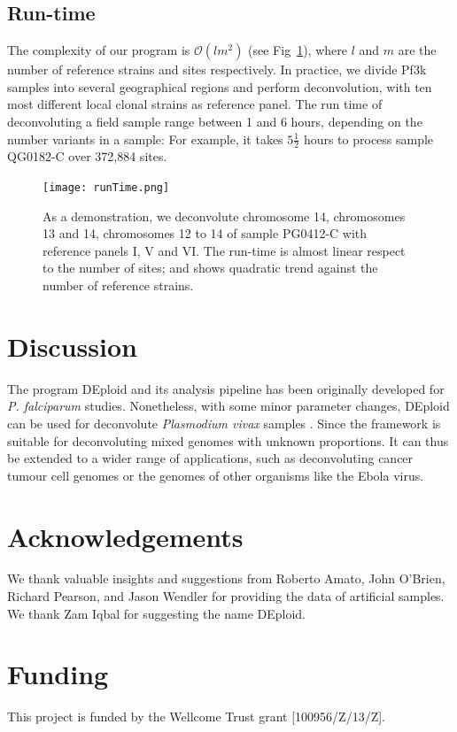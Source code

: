 \documentclass{bioinfo}
\begin{document}
\subsection{Run-time}
The complexity of our program is $\mathcal{O}(lm^2)$ (see Fig~\ref{fig:runtime}), where $l$ and $m$ are the number of reference strains and sites respectively. In practice, we divide Pf3k samples into several geographical regions and perform deconvolution, with ten most different local clonal strains as reference panel. The run time of deconvoluting a field sample range between 1 and 6 hours, depending on the number variants in a sample: For example, it takes $5\frac{1}{2}$ hours to process sample {\textmd QG0182-C} over 372,884 sites.


\begin{figure}[htb]
\centering
\texttt{[image: runTime.png]}
\caption{As a demonstration, we deconvolute chromosome 14, chromosomes 13 and 14, chromosomes 12 to 14 of sample {\textmd PG0412-C} with reference panels I, V and VI. The run-time is almost linear respect to the number of sites; and shows quadratic trend against the number of reference strains.}\label{fig:runtime}
\end{figure}

\section{Discussion}
The program DEploid and its analysis pipeline has been originally developed for {\it P. falciparum} studies. Nonetheless, with some minor parameter changes, DEploid can be used for deconvolute {\it Plasmodium vivax} samples \citep{Pearson2016}. Since the framework is suitable for deconvoluting mixed genomes with unknown proportions. It can thus be extended to a wider range of applications, such as deconvoluting cancer tumour cell genomes or the genomes of other organisms like the Ebola virus.

\section*{Acknowledgements}
We thank valuable insights and suggestions from Roberto Amato, John O'Brien, Richard Pearson, and Jason Wendler for providing the data of artificial samples. We thank Zam Iqbal for suggesting the name DEploid.

\section*{Funding}
This project is funded by the Wellcome Trust grant [100956/Z/13/Z].\\
~\\
\end{document}
